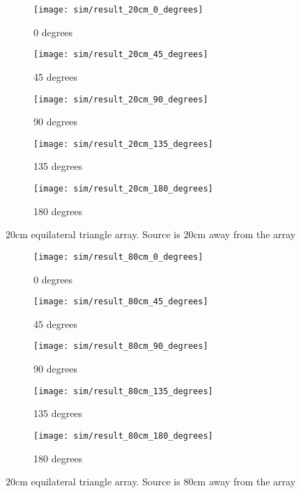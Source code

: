 \begin{figure*}[]
  \centering
  \begin{subfigure}[]{.3\textwidth}
    \texttt{[image: sim/result\_20cm\_0\_degrees]}
    \caption{0 degrees}
  \end{subfigure}
  \begin{subfigure}[]{.3\textwidth}
    \texttt{[image: sim/result\_20cm\_45\_degrees]}
    \caption{45 degrees}
  \end{subfigure}
  \begin{subfigure}[]{.3\textwidth}
    \texttt{[image: sim/result\_20cm\_90\_degrees]}
    \caption{90 degrees}
  \end{subfigure}
  \begin{subfigure}[]{.3\textwidth}
    \texttt{[image: sim/result\_20cm\_135\_degrees]}
    \caption{135 degrees}
  \end{subfigure}
  \begin{subfigure}[]{.3\textwidth}
    \texttt{[image: sim/result\_20cm\_180\_degrees]}
    \caption{180 degrees}
  \end{subfigure}
  \caption{$20$cm equilateral triangle array. Source is $20$cm away from the array}
  \label{fig:sim_3_2}
\end{figure*}

\begin{figure*}[]
  \centering
  \begin{subfigure}[]{.3\textwidth}
    \texttt{[image: sim/result\_80cm\_0\_degrees]}
    \caption{0 degrees}
  \end{subfigure}
  \begin{subfigure}[]{.3\textwidth}
    \texttt{[image: sim/result\_80cm\_45\_degrees]}
    \caption{45 degrees}
  \end{subfigure}
  \begin{subfigure}[]{.3\textwidth}
    \texttt{[image: sim/result\_80cm\_90\_degrees]}
    \caption{90 degrees}
  \end{subfigure}
  \begin{subfigure}[]{.3\textwidth}
    \texttt{[image: sim/result\_80cm\_135\_degrees]}
    \caption{135 degrees}
  \end{subfigure}
  \begin{subfigure}[]{.3\textwidth}
    \texttt{[image: sim/result\_80cm\_180\_degrees]}
    \caption{180 degrees}
  \end{subfigure}
  \caption{$20$cm equilateral triangle array. Source is $80$cm away from the array}
  \label{fig:sim_3_8}
\end{figure*}

